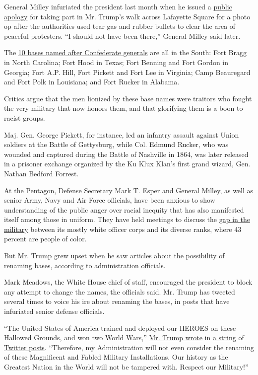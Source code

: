 General Milley infuriated the president last month when he issued a
\href{https://www.nytimes.com/2020/06/11/us/politics/trump-milley-military-protests-lafayette-square.html}{public
apology} for taking part in Mr. Trump's walk across Lafayette Square for
a photo op after the authorities used tear gas and rubber bullets to
clear the area of peaceful protesters. ``I should not have been there,''
General Milley said later.

The
\href{https://www.nytimes.com/2020/06/11/us/military-bases-confederates.html}{10
bases named after Confederate generals} are all in the South: Fort Bragg
in North Carolina; Fort Hood in Texas; Fort Benning and Fort Gordon in
Georgia; Fort A.P. Hill, Fort Pickett and Fort Lee in Virginia; Camp
Beauregard and Fort Polk in Louisiana; and Fort Rucker in Alabama.

Critics argue that the men lionized by these base names were traitors
who fought the very military that now honors them, and that glorifying
them is a boon to racist groups.

Maj. Gen. George Pickett, for instance, led an infantry assault against
Union soldiers at the Battle of Gettysburg, while Col. Edmund Rucker,
who was wounded and captured during the Battle of Nashville in 1864, was
later released in a prisoner exchange organized by the Ku Klux Klan's
first grand wizard, Gen. Nathan Bedford Forrest.

At the Pentagon, Defense Secretary Mark T. Esper and General Milley, as
well as senior Army, Navy and Air Force officials, have been anxious to
show understanding of the public anger over racial inequity that has
also manifested itself among those in uniform. They have held meetings
to discuss the
\href{https://www.nytimes.com/2020/05/25/us/politics/military-minorities-leadership.html}{gap
in the military} between its mostly white officer corps and its diverse
ranks, where 43 percent are people of color.

But Mr. Trump grew upset when he saw articles about the possibility of
renaming bases, according to administration officials.

Mark Meadows, the White House chief of staff, encouraged the president
to block any attempt to change the names, the officials said. Mr. Trump
has tweeted several times to voice his ire about renaming the bases, in
posts that have infuriated senior defense officials.

``The United States of America trained and deployed our HEROES on these
Hallowed Grounds, and won two World Wars,''
\href{https://twitter.com/realDonaldTrump/status/1270787974880526337}{Mr.
Trump wrote} in
\href{https://twitter.com/realDonaldTrump/status/1270787975719391233}{a
string} of
\href{https://twitter.com/realDonaldTrump/status/1270787978626052096}{Twitter
posts}. ``Therefore, my Administration will not even consider the
renaming of these Magnificent and Fabled Military Installations. Our
history as the Greatest Nation in the World will not be tampered with.
Respect our Military!''

